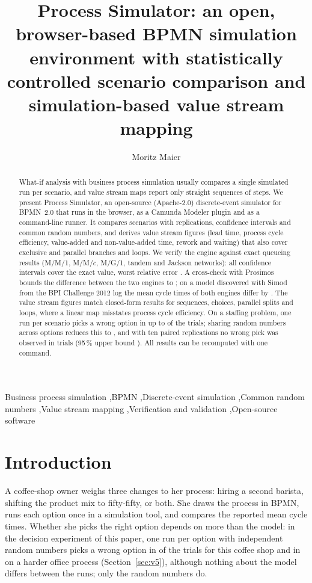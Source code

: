 \documentclass[preprint,12pt,nonatbib]{elsarticle}
\newcommand{\tool}{Process Simulator}
\begin{document}
\begin{frontmatter}
\title{Process Simulator: an open, browser-based BPMN simulation environment with statistically controlled scenario comparison and simulation-based value stream mapping}
\author{Moritz Maier}

\begin{abstract}
What-if analysis with business process simulation usually compares a single simulated run per scenario, and value stream maps report only straight sequences of steps. We present \tool, an open-source (Apache-2.0) discrete-event simulator for BPMN~2.0 that runs in the browser, as a Camunda Modeler plugin and as a command-line runner. It compares scenarios with replications, confidence intervals and common random numbers, and derives value stream figures (lead time, process cycle efficiency, value-added and non-value-added time, rework and waiting) that also cover exclusive and parallel branches and loops. We verify the engine against exact queueing results (M/M/1, M/M/$c$, M/G/1, tandem and Jackson networks): all \VoneCovered{} confidence intervals cover the exact value, worst relative error \VoneWorst. A cross-check with Prosimos bounds the difference between the two engines to \VtwoBound; on a model discovered with Simod from the BPI Challenge 2012 log the mean cycle times of both engines differ by \VthreeDiff. The value stream figures match closed-form results for sequences, choices, parallel splits and loops, where a linear map misstates process cycle efficiency. On a staffing problem, one run per scenario picks a wrong option in up to \VfiveOfficeIndep{} of the trials; sharing random numbers across options reduces this to \VfiveOfficeKeyed{}, and with ten paired replications no wrong pick was observed in \VfiveOfficeRepTrials{} trials (95\,\% upper bound \VfiveOfficeRepUpper). All results can be recomputed with one command.
\end{abstract}

\begin{keyword}
Business process simulation \sep BPMN \sep Discrete-event simulation \sep Common random numbers \sep Value stream mapping \sep Verification and validation \sep Open-source software
\end{keyword}
\end{frontmatter}

\section{Introduction}
\label{sec:intro}
A coffee-shop owner weighs three changes to her process: hiring a second barista, shifting the product mix to fifty-fifty, or both. She draws the process in BPMN, runs each option once in a simulation tool, and compares the reported mean cycle times. Whether she picks the right option depends on more than the model: in the decision experiment of this paper, one run per option with independent random numbers picks a wrong option in \VfiveCoffeeIndep{} of the trials for this coffee shop and in \VfiveOfficeIndep{} on a harder office process (Section~\ref{sec:v5}), although nothing about the model differs between the runs; only the random numbers do.
\end{document}
